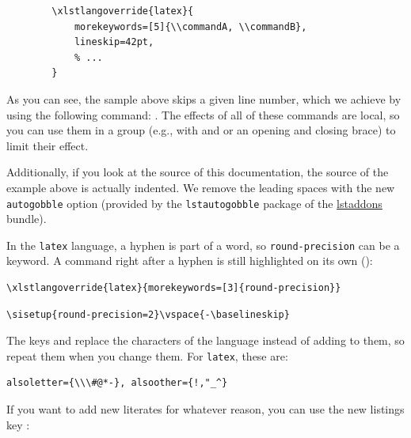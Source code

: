 \documentclass[a4paper,10pt,parskip=half,numbers=noenddot]{scrartcl}
\let\T\texttt
\def\argref#1#2{\CodeLinkRef[group=opt]{#1}}
\begin{document}
\begingroup
{}
\begin{verbatim}
        \xlstlangoverride{latex}{
            morekeywords=[5]{\\commandA, \\commandB},
            lineskip=42pt,
            % ...
        }
\end{verbatim}
\endgroup

As you can see, the sample above skips a given line number, which we achieve by using the following command: .
The effects of all of these commands are local, so you can use them in a group (e.g., with \blatex{\\begingroup} and \blatex{\\endgroup} or an opening and closing brace) to limit their effect.

Additionally, if you look at the source of this documentation, the source of the example above is actually indented. We remove the leading spaces with the new \T{autogobble} option (provided by the \T{lstautogobble} package of the \href{https://ctan.org/pkg/lstaddons}{lstaddons} bundle).

In the \T{latex} language, a hyphen is part of a word, so \T{round-precision} can be a keyword.
A command right after a hyphen is still highlighted on its own (\argref{xlstcsbreak}{xlstcsbreak}):

\begin{verbatim}
\xlstlangoverride{latex}{morekeywords=[3]{round-precision}}
\end{verbatim}

\begingroup
{}
\begin{verbatim}
\sisetup{round-precision=2}\vspace{-\baselineskip}
\end{verbatim}
\endgroup

The keys  and  replace the characters of the language instead of adding to them, so repeat them when you change them. For \T{latex}, these are:

\begin{verbatim}
alsoletter={\\\#@*-}, alsoother={!,"_^}
\end{verbatim}

If you want to add new literates for whatever reason, you can use the new listings key \argref{add to literate}{add to literate}:
\end{document}

